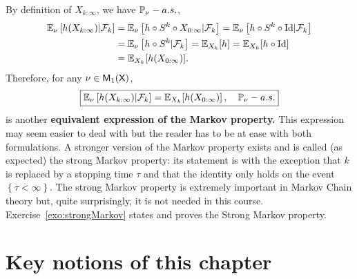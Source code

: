 \documentclass[english,graybox,envcountchap,envcountsame,sectrefs,shortlabels]{svmono}
\theoremstyle{style}
\begin{document}
By definition of $X_{k:\infty}$, we have $\mathbb{P}_{\nu}-a.s.$,
\begin{align*}
\mathbb{E}_{\nu}\left[h(X_{k:\infty})|\mathcal{F}_{k}\right] & =\mathbb{E}_{\nu}\left[h\circ S^{k}\circ X_{0:\infty}|\mathcal{F}_{k}\right]=\mathbb{E}_{\nu}\left[h\circ S^{k}\circ \mathrm{Id}|\mathcal{F}_{k}\right]\\
 & =\mathbb{E}_{\nu}\left[h\circ S^{k}|\mathcal{F}_{k}\right]=\mathbb{E}_{X_{k}}[h]=\mathbb{E}_{X_{k}}[h\circ \mathrm{Id}]\\
 & =\mathbb{E}_{X_{k}}[h(X_{0:\infty})].
\end{align*}
 Therefore, for any $\nu\in\mathsf{M}_{1}(\mathsf{X})$,
\[
\boxed{\mathbb{E}_{\nu}\left[h(X_{k:\infty})|\mathcal{F}_{k}\right]=\mathbb{E}_{X_{k}}[h(X_{0:\infty})]\,,\quad\mathbb{P}_{\nu}-a.s.}
\]
 is another \textbf{equivalent expression of the Markov property.
}This expression may seem easier to deal with but the reader has to
be at ease with both formulations. A stronger version of the Markov
property exists and is called (as expected) the strong Markov property:
its statement is  with the exception that $k$
is replaced by a stopping time $\tau$ and that the identity only
holds on the event $\left\{ \tau<\infty\right\} $. The strong Markov
property is extremely important in Markov Chain theory but, quite
surprisingly, it is not needed in this course.  Exercise~\ref{exo:strongMarkov} states and proves the Strong Markov property.


\section{Key notions of this chapter}
\begin{center}
\end{center}
\end{document}
